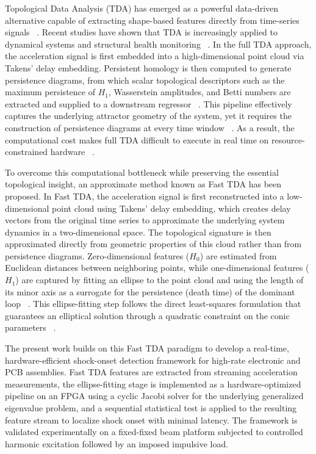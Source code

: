 \documentclass[colorlinks,upint,subscriptcorrection,varvw,hyphenate,balance,greek,russian,vietnamese,german]{asmeconf} %
\begin{document}
Topological Data Analysis (TDA) has emerged as a powerful data-driven alternative capable of extracting shape-based features directly from time-series signals ~\cite{Razmarashooli2023TDA}. Recent studies have shown that TDA is increasingly applied to dynamical systems and structural health monitoring ~\cite{Tempelman2020lookchaosdetection,Gowdridge2022TopologicalDataAnalysis}. In the full TDA approach, the acceleration signal is first embedded into a high-dimensional point cloud via Takens' delay embedding. Persistent homology is then computed to generate persistence diagrams, from which scalar topological descriptors such as the maximum persistence of \(H_1\), Wasserstein amplitudes, and Betti numbers are extracted and supplied to a downstream regressor ~\cite{Chua2025Probabilisticmachinelearning}. This pipeline effectively captures the underlying attractor geometry of the system, yet it requires the construction of persistence diagrams at every time window ~\cite{Razmarashooli2025Realtimestate}. As a result, the computational cost makes full TDA difficult to execute in real time on resource-constrained hardware ~\cite{SalazarMartinez2025FastTopologicalData}.

To overcome this computational bottleneck while preserving the essential topological insight, an approximate method known as Fast TDA has been proposed. In Fast TDA, the acceleration signal is first reconstructed into a low-dimensional point cloud using Takens' delay embedding, which creates delay vectors from the original time series to approximate the underlying system dynamics in a two-dimensional space. The topological signature is then approximated directly from geometric properties of this cloud rather than from persistence diagrams. Zero-dimensional features (\(H_0\)) are estimated from Euclidean distances between neighboring points, while one-dimensional features (\(H_1\)) are captured by fitting an ellipse to the point cloud and using the length of its minor axis as a surrogate for the persistence (death time) of the dominant loop ~\cite{SalazarMartinez2025FastTopologicalData}. This ellipse-fitting step follows the direct least-squares formulation that guarantees an elliptical solution through a quadratic constraint on the conic parameters ~\cite{Fitzgibbon1999Directleastsquare}.

The present work builds on this Fast TDA paradigm to develop a real-time, hardware-efficient shock-onset detection framework for high-rate electronic and PCB assemblies. Fast TDA features are extracted from streaming acceleration measurements, the ellipse-fitting stage is implemented as a hardware-optimized pipeline on an FPGA using a cyclic Jacobi solver for the underlying generalized eigenvalue problem, and a sequential statistical test is applied to the resulting feature stream to localize shock onset with minimal latency. The framework is validated experimentally on a fixed-fixed beam platform subjected to controlled harmonic excitation followed by an imposed impulsive load.
\end{document}
